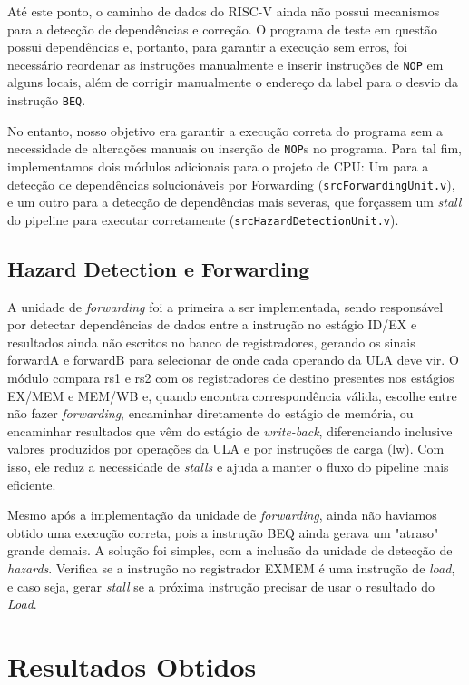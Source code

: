 \documentclass{sbc2023}%
\begin{document}
Até este ponto, o caminho de dados do RISC-V ainda não possui mecanismos para a detecção de dependências e correção. O programa de teste em questão possui dependências e, portanto, para garantir a execução sem erros, foi necessário reordenar as instruções manualmente e inserir instruções de \texttt{NOP} em alguns locais, além de corrigir manualmente o endereço da label para o desvio da instrução \texttt{BEQ}.

No entanto, nosso objetivo era garantir a execução correta do programa sem a necessidade de alterações manuais ou inserção de \texttt{NOP}s no programa. Para tal fim, implementamos dois módulos adicionais para o projeto de CPU: Um para a detecção de dependências solucionáveis por Forwarding (\texttt{src\/ForwardingUnit.v}), e um outro para a detecção de dependências mais severas, que forçassem um \textit{stall} do pipeline para executar corretamente (\texttt{src\/HazardDetectionUnit.v}).

\subsection{Hazard Detection e Forwarding}

A unidade de \textit{forwarding} foi a primeira a ser implementada, sendo responsável por detectar dependências de dados entre a instrução no estágio ID/EX e resultados ainda não escritos no banco de registradores, gerando os sinais forwardA e forwardB para selecionar de onde cada operando da ULA deve vir. O módulo compara rs1 e rs2 com os registradores de destino presentes nos estágios EX/MEM e MEM/WB e, quando encontra correspondência válida, escolhe entre não fazer \textit{forwarding}, encaminhar diretamente do estágio de memória, ou encaminhar resultados que vêm do estágio de \textit{write-back}, diferenciando inclusive valores produzidos por operações da ULA e por instruções de carga (lw). Com isso, ele reduz a necessidade de \textit{stalls} e ajuda a manter o fluxo do pipeline mais eficiente.

Mesmo após a implementação da unidade de \textit{forwarding}, ainda não haviamos obtido uma execução correta, pois a instrução BEQ ainda gerava um "atraso" grande demais. A solução foi simples, com a inclusão da unidade de detecção de \textit{hazards}. Verifica se a instrução no registrador EXMEM é uma instrução de \textit{load}, e caso seja, gerar \textit{stall} se a próxima instrução precisar de usar o resultado do \textit{Load}.

\section{Resultados Obtidos}
\end{document}
